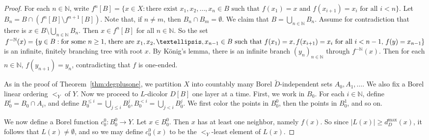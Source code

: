 \documentclass[psamsfonts]{amsart}
\theoremstyle{definition}
\newcommand{\N}{\mathbb N}
\theoremstyle{remark}
\numberwithin{equation}{section}
\begin{document}
\begin{proof}
    For each $n \in \N$, write $f^n[B] = \{x \in X : \text{there exist } x_1, x_2, \dots, x_n \in B \text{ such that } f(x_1) = x \text{ and } f(x_{i + 1}) = x_i \text{ for all $i < n$} \}$. Let $B_n = B \cap (f^n[B] \setminus f^{n + 1}[B])$. Note that, if $n \neq m$, then $B_n \cap B_m = \emptyset$. We claim that $B = \bigcup_{n \in \N} B_n$. Assume for contradiction that there is $x \in B \setminus \bigcup_{n \in \N} B_n$. Then $x \in f^n[B]$ for all $n \in \N$. So the set $f^{-\N}(x) = \{y \in B : \text{for some $n \geq 1$, there are } \\ x_1, x_2, \dots, x_{n - 1} \in B \text{ such that } f(x_1) = x, f(x_{i + 1}) = x_i \text{ for all $i < n - 1$, } f(y) = x_{n -1} \}$ is an infinite, finitely branching tree with root $x$. By K{\" o}nig's lemma, there is an infinite branch $(y_n)_{n \in \N}$ through $f^{-\N}(x)$. Then for each $n \in \N$, $f(y_{n + 1}) = y_n$, contradicting that $f$ is one-ended.

    As in the proof of Theorem~\ref{thm:degplusone}, we partition $X$ into countably many Borel $\tilde{D}$-independent sets $A_0, A_1, \dots$. We also fix a Borel linear ordering $<_Y$ of $Y$. Now we proceed to $L$-dicolor $D[B]$ one layer at a time. First, we work in $B_0$. For each $i \in \N$, define $B_0^i = B_0 \cap A_i$, and define $B_0^{\leq i} = \bigcup_{j \leq i} B_0^j, B_0^{< i} = \bigcup_{j < i} B_0^j$. We first color the points in $B_0^0$, then the points in $B_0^1$, and so on.

    We now define a Borel function $c_0^0 : B_0^0 \to Y$. Let $x \in B_0^0$. Then $x$ has at least one neighbor, namely $f(x)$. So since $\vert L(x) \vert \geq d^{\max}_D(x)$, it follows that $L(x) \neq \emptyset$, and so we may define $c_0^0(x)$ to be the $<_Y$-least element of $L(x)$.


\end{proof}
\end{document}
